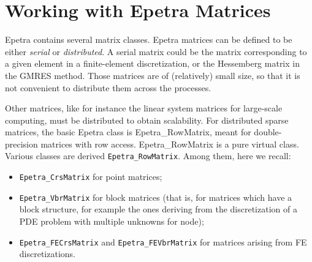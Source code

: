 % 
% 
% 
%  
%  
% 

\section{Working with Epetra Matrices}
\label{chap:epetra_mat}

Epetra contains several matrix classes.  Epetra matrices can be defined
to be either {\em serial} or {\em distributed}. A serial matrix could be
the matrix corresponding to a given element in a finite-element
discretization, or the Hessemberg matrix in the GMRES method. Those
matrices are of (relatively) small size, so that it is not convenient to
distribute them across the processes.

Other matrices, like for instance the linear system matrices for
large-scale computing, must be distributed to obtain scalability.  For
distributed sparse matrices, the basic Epetra class is
Epetra\_RowMatrix, meant for double-precision matrices with row access.
Epetra\_RowMatrix is a pure virtual class.  Various classes are derived
\verb!Epetra_RowMatrix!. Among them, here we recall:
\begin{itemize}
\item \verb!Epetra_CrsMatrix! for point matrices;
\item \verb!Epetra_VbrMatrix! for block matrices (that is, for
  matrices which have a block structure, for example the ones deriving
  from the discretization of a PDE problem with multiple unknowns for
  node);
\item \verb!Epetra_FECrsMatrix! and \verb!Epetra_FEVbrMatrix! for
  matrices arising from FE discretizations.
\end{itemize}

